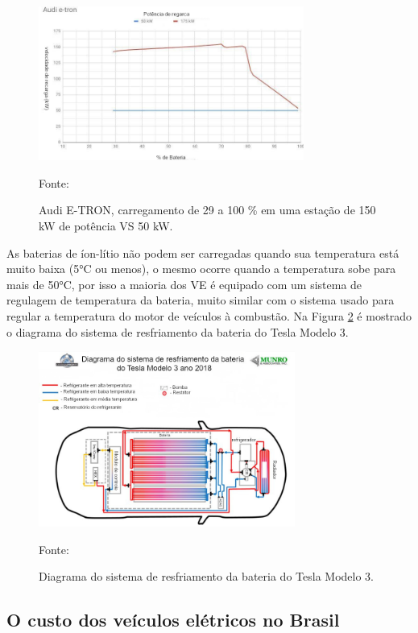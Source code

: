 \begin{figure}[H]
    \centering
    \includegraphics[width=0.775\textwidth]{./Figuras/Audi-e-tron-charging-session.jpg}
    \caption{Audi E-TRON, carregamento de 29 a 100 \% em uma estação de 150 kW de potência VS 50 kW.}{Fonte: \cite{electrek}}
   \label{fig:Audi-e-tron-charging-session}
\end{figure}

As baterias de íon-lítio não podem ser carregadas quando sua temperatura está muito baixa (5°C ou menos), o mesmo ocorre quando a temperatura sobe para mais de 50°C, por isso a maioria dos VE é equipado com um sistema de regulagem de temperatura da bateria, muito similar com o sistema usado para regular a temperatura do motor de veículos à combustão. Na Figura \ref{fig:tesla_cooling} é mostrado o diagrama do sistema de resfriamento da bateria do Tesla Modelo 3.

\begin{figure}[H]
    \centering
    \includegraphics[width=0.75\textwidth]{./Figuras/tesla_cooling.jpg}
    \caption{Diagrama do sistema de resfriamento da bateria do Tesla Modelo 3.}{Fonte: \cite{leandesign}}
   \label{fig:tesla_cooling}
\end{figure}

\subsection{O custo dos veículos elétricos no Brasil}

